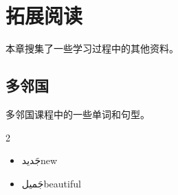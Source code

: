 \chapter{拓展阅读}

本章搜集了一些学习过程中的其他资料。

\section{多邻国}

多邻国课程中的一些单词和句型。

\begin{multicols}{2}
    \begin{itemize}
        \item \ac{جَديد}{new}
        \item \ac{جَميل}{beautiful}
        
    \end{itemize}
\end{multicols}

